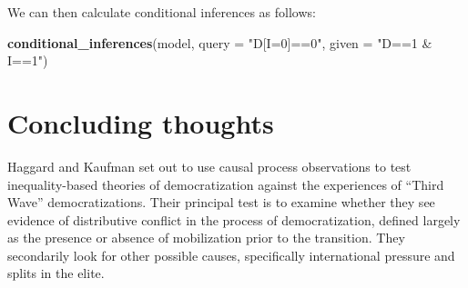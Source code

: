 \documentclass[12pt,]{book}
\newenvironment{Shaded}{\begin{snugshade}}{\end{snugshade}}
\newcommand{\DataTypeTok}[1]{\textcolor[rgb]{0.13,0.29,0.53}{#1}}
\newcommand{\KeywordTok}[1]{\textcolor[rgb]{0.13,0.29,0.53}{\textbf{#1}}}
\newcommand{\NormalTok}[1]{#1}
\newcommand{\OperatorTok}[1]{\textcolor[rgb]{0.81,0.36,0.00}{\textbf{#1}}}
\newcommand{\StringTok}[1]{\textcolor[rgb]{0.31,0.60,0.02}{#1}}
\begin{document}
\begin{Shaded}
\end{Shaded}

We can then calculate conditional inferences as follows:

\begin{Shaded}
\begin{Highlighting}[]
\KeywordTok{conditional_inferences}\NormalTok{(model, }
                       \DataTypeTok{query =} \StringTok{"D[I=0]==0"}\NormalTok{,}
                       \DataTypeTok{given =} \StringTok{"D==1 & I==1"}\NormalTok{)}
\end{Highlighting}
\end{Shaded}

\hypertarget{concluding-thoughts}{%
\section{Concluding thoughts}\label{concluding-thoughts}}

Haggard and Kaufman set out to use causal process observations to test inequality-based theories of democratization against the experiences of ``Third Wave'' democratizations. Their principal test is to examine whether they see evidence of distributive conflict in the process of democratization, defined largely as the presence or absence of mobilization prior to the transition. They secondarily look for other possible causes, specifically international pressure and splits in the elite.
\end{document}

